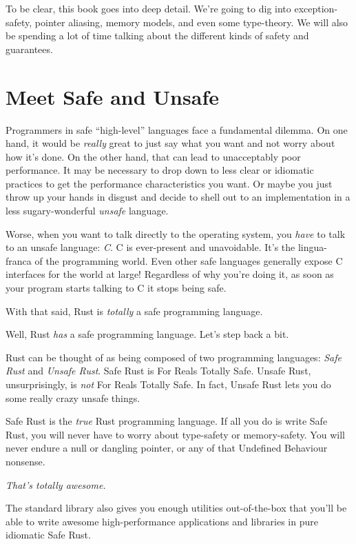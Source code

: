 \documentclass[a4paper,]{book}
\begin{document}
To be clear, this book goes into deep detail. We're going to dig into
exception-safety, pointer aliasing, memory models, and even some
type-theory. We will also be spending a lot of time talking about the
different kinds of safety and guarantees.

\chapter{Meet Safe and Unsafe}\label{sec--meet-safe-and-unsafe}

Programmers in safe ``high-level'' languages face a fundamental dilemma.
On one hand, it would be \emph{really} great to just say what you want
and not worry about how it's done. On the other hand, that can lead to
unacceptably poor performance. It may be necessary to drop down to less
clear or idiomatic practices to get the performance characteristics you
want. Or maybe you just throw up your hands in disgust and decide to
shell out to an implementation in a less sugary-wonderful \emph{unsafe}
language.

Worse, when you want to talk directly to the operating system, you
\emph{have} to talk to an unsafe language: \emph{C}. C is ever-present
and unavoidable. It's the lingua-franca of the programming world. Even
other safe languages generally expose C interfaces for the world at
large! Regardless of why you're doing it, as soon as your program starts
talking to C it stops being safe.

With that said, Rust is \emph{totally} a safe programming language.

Well, Rust \emph{has} a safe programming language. Let's step back a
bit.

Rust can be thought of as being composed of two programming languages:
\emph{Safe Rust} and \emph{Unsafe Rust}. Safe Rust is For Reals Totally
Safe. Unsafe Rust, unsurprisingly, is \emph{not} For Reals Totally Safe.
In fact, Unsafe Rust lets you do some really crazy unsafe things.

Safe Rust is the \emph{true} Rust programming language. If all you do is
write Safe Rust, you will never have to worry about type-safety or
memory-safety. You will never endure a null or dangling pointer, or any
of that Undefined Behaviour nonsense.

\emph{That's totally awesome.}

The standard library also gives you enough utilities out-of-the-box that
you'll be able to write awesome high-performance applications and
libraries in pure idiomatic Safe Rust.
\end{document}
